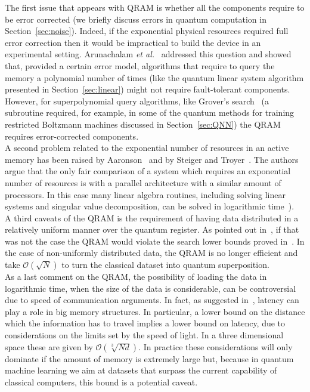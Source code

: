 \documentclass[a4paper, 11pt]{article}
\newcommand{\Ord}[1]{\mathcal{O}(#1)}
\begin{document}
The first issue that appears with QRAM is whether all the components require to be error corrected (we briefly discuss errors in quantum computation in Section~\ref{sec:noise}). Indeed, if the exponential physical resources required full error correction then it would be impractical to build the device in an experimental setting. Arunachalam \textit{et al.}~\cite{arunachalam2015robustness} addressed this question and showed that, provided a certain error model, algorithms that require to query the memory a polynomial number of times (like the quantum linear system algorithm presented in Section~\ref{sec:linear}) might not require fault-tolerant components. However, for superpolynomial query algorithms, like Grover's search~\cite{grover1996fast} (a subroutine required, for example, in some of the quantum methods for training restricted Boltzmann machines discussed in Section~\ref{sec:QNN}) the QRAM requires error-corrected components.\\

A second problem related to the exponential number of resources in an active memory has been raised by Aaronson~\cite{aaronson2015read} and by Steiger and Troyer~\cite{steiger2016perimeter}. The authors argue that the only fair comparison of a system which requires an exponential number of resources is with a parallel architecture with a similar amount of processors. In this case many linear algebra routines, including solving linear systems and singular value decomposition, can be solved in logarithmic time~\cite{csanky1976fast}).\\

A third caveats of the QRAM is the requirement of having data distributed in a relatively uniform manner over the quantum register. As pointed out in~\cite{prakash2014quantum, aaronson2015read}, if that was not the case the QRAM would violate the search lower bounds proved in~\cite{bennett1997strengths}. In the case of non-uniformly distributed data, the QRAM is no longer efficient and take $\Ord{\sqrt{N}}$ to turn the classical dataset into quantum superposition.\\

As a last comment on the QRAM, the possibility of loading the data in logarithmic time, when the size of the data is considerable, can be controversial due to speed of communication arguments. In fact, as suggested in~\cite{aaronson2015read}, latency can play a role in big memory structures. In particular, a lower bound on the distance which the information has to travel implies a lower bound on latency, due to considerations on the limits set by the speed of light. In a three dimensional space these are given by $\Ord{\sqrt[3]{Nd}}$. In practice these considerations will only dominate if the amount of memory is extremely large but, because in quantum machine learning we aim at datasets that surpass the current capability of classical computers, this bound is a potential caveat.\\
\end{document}

